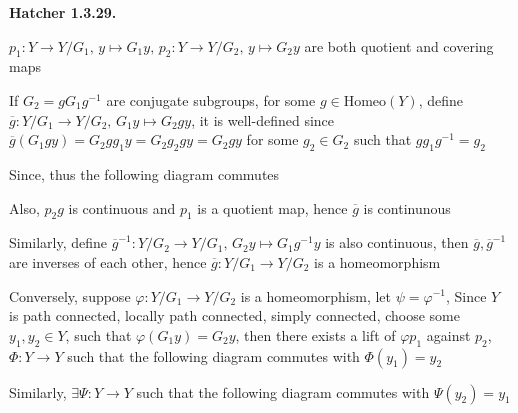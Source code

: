 \documentclass[../main.tex]{subfiles}
\begin{document}
\textbf{Hatcher 1.3.29.} \par
$p_1:Y\rightarrow Y/G_1, \, y\mapsto G_1y, \,p_2:Y\rightarrow Y/G_2, \, y\mapsto G_2y$ are both quotient and covering maps \par
If $G_2=gG_1g^{-1}$ are conjugate subgroups, for some $g\in \mathrm{Homeo}(Y)$, define $\overline{g}:Y/G_1 \rightarrow Y/G_2, \, G_1y\mapsto G_2gy $, it is well-defined since $\overline{g}(G_1gy)=G_2gg_1y=G_2g_2gy=G_2gy$ for some $g_2\in G_2$ such that $gg_1g^{-1}=g_2$ \par
Since, thus the following diagram commutes
\begin{center}
\end{center}
Also, $p_2g$ is continuous and $p_1$ is a quotient map, hence $\overline{g}$ is continunous \par
Similarly, define $\overline{g}^{-1}:Y/G_2\rightarrow Y/G_1, \, G_2y\mapsto G_1g^{-1}y$ is also continuous, then $\overline{g},\overline{g}^{-1}$ are inverses of each other, hence $\overline{g}:Y/G_1 \rightarrow Y/G_2$ is a homeomorphism \par
Conversely, suppose $\varphi:Y/G_1 \rightarrow Y/G_2$ is a homeomorphism, let $\psi=\varphi^{-1}$, Since $Y$ is path connected, locally path connected, simply connected, choose some $y_1,y_2\in Y$, such that $\varphi(G_1y)=G_2y$, then there exists a lift of $\varphi p_1$ against $p_2$, $\Phi:Y\rightarrow Y$ such that the following diagram commutes with $\Phi(y_1)=y_2$ \par
\begin{center}
\end{center}
Similarly, $\exists\Psi:Y\rightarrow Y$ such that the following diagram commutes with $\Psi(y_2)=y_1$ \par
\begin{center}
\end{center}
\end{document}
